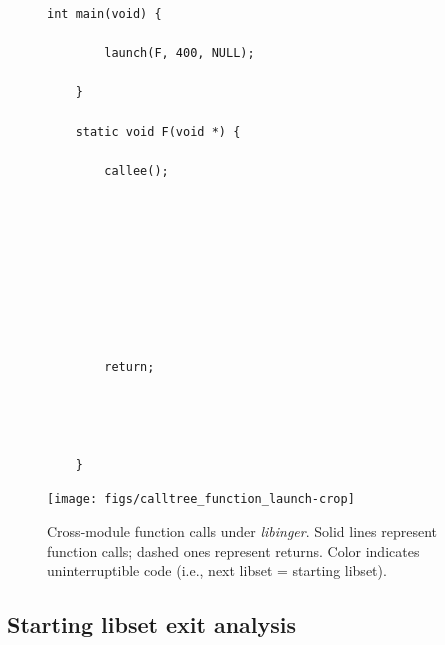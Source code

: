 \begin{figure}
	\begin{minipage}{0.25\textwidth}
	\begin{lstlisting}[basicstyle=\footnotesize\ttfamily,tabsize=2,gobble=2]
	int main(void) {

		launch(F, 400, NULL);

	}

	static void F(void *) {

		callee();









		return;




	}
	\end{lstlisting}
	\end{minipage}
%
	\begin{minipage}{0.75\textwidth}
	\texttt{[image: figs/calltree\_function\_launch-crop]}
	\end{minipage}
\caption[Cross-module function calls under \textit{libinger}]{
Cross-module function calls under \textit{libinger}. Solid lines represent function
calls; dashed ones represent returns. Color indicates uninterruptible code (i.e.,
next libset = starting libset).}
\label{fig:ingerhook}
\end{figure}


\subsection{Starting libset exit analysis}

